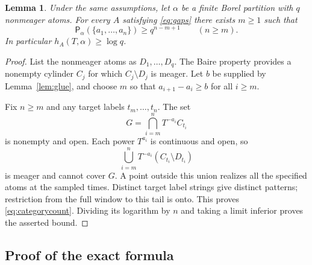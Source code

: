 \documentclass[11pt,reqno]{amsart}
\numberwithin{equation}{section}
\newtheorem{lemma}[theorem]{Lemma}
\theoremstyle{definition}
\theoremstyle{remark}
\newcommand{\Patt}{\mathsf P}
\begin{document}
\begin{lemma}\label{lem:borel}
Under the same assumptions, let $\alpha$ be a finite Borel partition
with $q$ nonmeager atoms. For every $A$ satisfying \eqref{eq:gaps} there
exists $m\ge1$ such that
\begin{equation}\label{eq:categorycount}
 \Patt_\alpha(\{a_1,\ldots,a_n\})\ge q^{n-m+1}\qquad(n\ge m).
\end{equation}
In particular $h_A(T,\alpha)\ge\log q$.
\end{lemma}
\begin{proof}
List the nonmeager atoms as $D_1,\ldots,D_q$. The Baire property
provides a nonempty cylinder $C_j$ for which $C_j\setminus D_j$ is
meager. Let $b$ be supplied by Lemma~\ref{lem:glue}, and choose $m$ so
that $a_{i+1}-a_i\ge b$ for all $i\ge m$.

Fix $n\ge m$ and any target labels $t_m,\ldots,t_n$. The set
\[
 G=\bigcap_{i=m}^n T^{-a_i}C_{t_i}
\]
is nonempty and open. Each power $T^{a_i}$ is continuous and open, so
\[
 \bigcup_{i=m}^n T^{-a_i}(C_{t_i}\setminus D_{t_i})
\]
is meager and cannot cover $G$. A point outside this union realizes
all the specified atoms at the sampled times. Distinct target label
strings give distinct patterns; restriction from the full window to
this tail is onto. This proves \eqref{eq:categorycount}. Dividing its
logarithm by $n$ and taking a limit inferior proves the asserted bound.
\end{proof}

\subsection{Proof of the exact formula}
\end{document}
